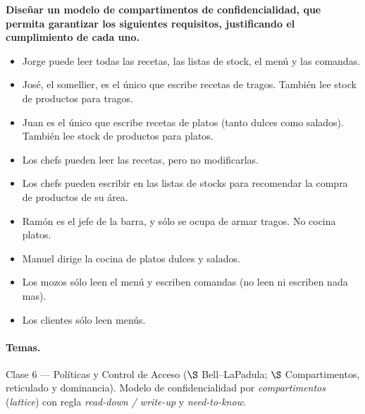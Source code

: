 \begin{consigna}
\textbf{Diseñar un modelo de compartimentos de confidencialidad, que permita garantizar
los siguientes requisitos, justificando el cumplimiento de cada uno.}
\begin{itemize}
  \item Jorge puede leer todas las recetas, las listas de stock, el menú y las comandas.
  \item José, el somellier, es el único que escribe recetas de tragos. También lee stock de
        productos para tragos.
  \item Juan es el único que escribe recetas de platos (tanto dulces como salados). También lee
        stock de productos para platos.
  \item Los chefs pueden leer las recetas, pero no modificarlas.
  \item Los chefs pueden escribir en las listas de stocks para recomendar la compra de
        productos de su área.
  \item Ramón es el jefe de la barra, y sólo se ocupa de armar tragos. No cocina platos.
  \item Manuel dirige la cocina de platos dulces y salados.
  \item Los mozos sólo leen el menú y escriben comandas (no leen ni escriben nada mas).
  \item Los clientes sólo leen menús.
\end{itemize}
\end{consigna}

\paragraph{Temas.}
Clase 6 --- Políticas y Control de Acceso ($\S$ Bell--LaPadula; $\S$ Compartimentos, reticulado
y dominancia). Modelo de confidencialidad por \emph{compartimentos} (\emph{lattice}) con regla
\emph{read-down / write-up} y \emph{need-to-know}.

